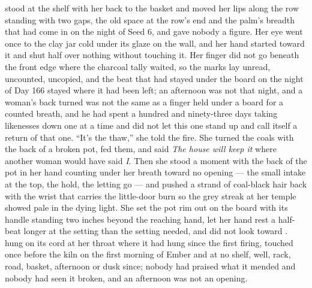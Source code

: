  stood at the shelf with her back to the basket and moved her lips along the row standing with two gaps, the old space at the row's end and the palm's breadth that had come in on the night of Seed 6, and gave nobody a figure. Her eye went once to the clay jar cold under its glaze on the wall, and her hand started toward it and shut half over nothing without touching it. Her finger did not go beneath the front edge where the charcoal tally waited, so the marks lay unread, uncounted, uncopied, and the beat that had stayed under the board on the night of Day 166 stayed where it had been left; an afternoon was not that night, and a woman's back turned was not the same as a finger held under a board for a counted breath, and he had spent a hundred and ninety-three days taking likenesses down one at a time and did not let this one stand up and call itself a return of that one. “It's the thaw,” she told the fire. She turned the coals with the back of a broken pot, fed them, and said \emph{The house will keep it} where another woman would have said \emph{I}. Then she stood a moment with the back of the pot in her hand counting under her breath toward no opening --- the small intake at the top, the hold, the letting go --- and pushed a strand of coal-black hair back with the wrist that carries the little-door burn so the grey streak at her temple showed pale in the dying light. She set the pot rim out on the board with its handle standing two inches beyond the reaching hand, let her hand rest a half-beat longer at the setting than the setting needed, and did not look toward .  hung on its cord at her throat where it had hung since the first firing, touched once before the kiln on the first morning of Ember and at no shelf, well, rack, road, basket, afternoon or dusk since; nobody had praised what it mended and nobody had seen it broken, and an afternoon was not an opening.

\scenebreak

